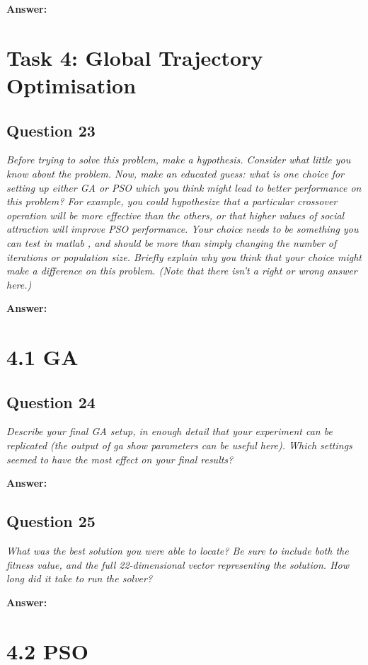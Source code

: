 \documentclass[a4paper]{article}
\begin{document}
\textbf{Answer:}

\section*{Task 4: Global Trajectory Optimisation}

\subsection*{Question 23}
\emph{Before trying to solve this problem, make a hypothesis. Consider what little you know about the problem. Now, make an educated guess: what is one choice for setting up either GA or PSO which you think might lead to better performance on this problem? For example, you could hypothesize that a particular crossover operation will be more effective than the others, or that higher values of social attraction will improve PSO performance. Your choice needs to be something you can test in matlab , and should be more than simply changing the number of iterations or population size. Briefly explain why you
think that your choice might make a difference on this problem. (Note that there isn’t a right or wrong answer here.)}

\textbf{Answer:}

\section*{4.1 GA}

\subsection*{Question 24}
\emph{Describe your final GA setup, in enough detail that your experiment can be replicated (the output of ga show parameters can be useful here). Which settings seemed to have the most effect on your final results?}

\textbf{Answer:}

\subsection*{Question 25}
\emph{What was the best solution you were able to locate? Be sure to
include both the fitness value, and the full 22-dimensional vector representing
the solution. How long did it take to run the solver?}

\textbf{Answer:}

\section*{4.2 PSO}
\end{document}
